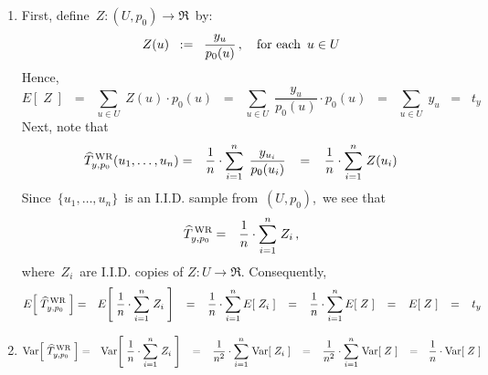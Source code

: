 \proof
\begin{enumerate}
\item
	First, define
	\,$Z : (U,p_{0}) \longrightarrow \Re$\, by:
	\begin{equation*}
	Z(u) \;\; := \;\; \dfrac{y_{u}}{p_{0}(u)}\,,
	\quad
	\textnormal{for each \,$u \in U$}
	\end{equation*}
	Hence,
	\begin{equation*}
	E\!\left[\;Z\;\right]
	\;\; = \;\;
		\underset{u \in U}{\sum}\; Z(u) \cdot p_{0}(u)
	\;\; = \;\;
		\underset{u \in U}{\sum}\; \dfrac{y_{u}}{p_{0}(u)} \cdot p_{0}(u)
	\;\; = \;\;
		\underset{u \in U}{\sum}\; y_{u}
	\;\; = \;\;
		t_{y}
	\end{equation*}
	Next, note that
	\begin{eqnarray*}
	\widehat{T}^{\,\textnormal{WR}}_{y,p_{0}}(u_{1},\ldots,u_{n})
	&=&
		\dfrac{1}{n}\cdot \overset{n}{\underset{i = 1}{\sum}}\;\, \dfrac{y_{u_{i}}}{p_{0}(u_{i})}
	\;\;\; = \;\;\;
		\dfrac{1}{n}\cdot \overset{n}{\underset{i = 1}{\sum}}\; Z(u_{i})
	\end{eqnarray*}
	Since \,$\{u_{1},\ldots,u_{n}\}$\, is an I.I.D. sample from \,$(U,p_{0})$,\,
	we see that
	\begin{eqnarray*}
	\widehat{T}^{\,\textnormal{WR}}_{y,p_{0}}
	&=&
		\dfrac{1}{n}\cdot \overset{n}{\underset{i = 1}{\sum}}\; Z_{i}\,,
	\end{eqnarray*}
	where \,$Z_{i}$\, are I.I.D. copies of $Z : U \longrightarrow \Re$.
	Consequently,
	\begin{eqnarray*}
	E\!\left[\;\widehat{T}^{\,\textnormal{WR}}_{y,p_{0}}\;\right]
	&=&
		E\!\left[\;
			\dfrac{1}{n}\cdot \overset{n}{\underset{i = 1}{\sum}}\; Z_{i}
			\;\right]
	\;\;\; = \;\;\;
		\dfrac{1}{n} \cdot
		\overset{n}{\underset{i = 1}{\sum}}\,
		E\!\left[\; Z_{i} \;\right]
	\;\;\; = \;\;\;
		\dfrac{1}{n} \cdot
		\overset{n}{\underset{i = 1}{\sum}}\,
		E\!\left[\; Z \;\right]
	\;\;\; = \;\;\;
		E\!\left[\; Z \;\right]
	\;\;\; = \;\;\;
		t_{y}
	\end{eqnarray*}
\item
	\begin{eqnarray*}
	\Var\!\left[\;\widehat{T}^{\,\textnormal{WR}}_{y,p_{0}}\;\right]
	& = &
		\Var\!\left[\;
			\dfrac{1}{n}\cdot \overset{n}{\underset{i = 1}{\sum}}\; Z_{i}
			\;\right]
	\;\;\; = \;\;\;
		\dfrac{1}{n^{2}}\cdot \overset{n}{\underset{i = 1}{\sum}}\;
		\Var\!\left[\; Z_{i} \;\right]
	\;\;\; = \;\;\;
		\dfrac{1}{n^{2}}\cdot \overset{n}{\underset{i = 1}{\sum}}\;
		\Var\!\left[\; Z \;\right]
	\;\;\; = \;\;\,
		\dfrac{1}{n}\cdot \Var\!\left[\; Z \;\right]

\end{eqnarray*}
\end{enumerate}
